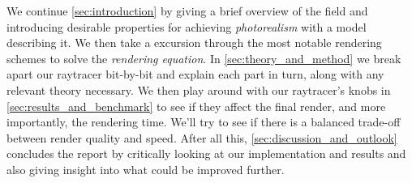 \documentclass[a4paper, twocolumn]{article}
\begin{document}
        We continue \cref{sec:introduction} by giving a brief overview of the field and introducing desirable properties for achieving \emph{photorealism} with a model describing it. We then take a excursion through the most notable rendering schemes to solve the \emph{rendering equation}. In \cref{sec:theory_and_method} we break apart our raytracer bit-by-bit and explain each part in turn, along with any relevant theory necessary. We then play around with our raytracer's knobs in \cref{sec:results_and_benchmark} to see if they affect the final render, and more importantly, the rendering time. We'll try to see if there is a balanced trade-off between render quality and speed. After all this, \cref{sec:discussion_and_outlook} concludes the report by critically looking at our implementation and results and also giving insight into what could be improved further.
\end{document}
